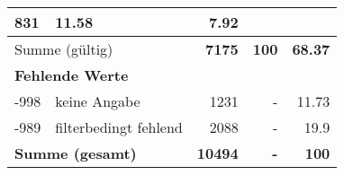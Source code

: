 \begin{longtable}{lXrrr}
       \num{831} &
       \num[round-mode=places,round-precision=2]{11.58} &
         \num[round-mode=places,round-precision=2]{7.92} \\
     \midrule
     \multicolumn{2}{l}{Summe (gültig)} &
       \textbf{\num{7175}} &
     \textbf{\num{100}} &
       \textbf{\num[round-mode=places,round-precision=2]{68.37}} \\
     \multicolumn{5}{l}{\textbf{Fehlende Werte}}\\
       -998 &
       keine Angabe &
         \num{1231} &
        - &
         \num[round-mode=places,round-precision=2]{11.73} \\
       -989 &
       filterbedingt fehlend &
         \num{2088} &
        - &
         \num[round-mode=places,round-precision=2]{19.9} \\
     \midrule
     \multicolumn{2}{l}{\textbf{Summe (gesamt)}} &
          \textbf{\num{10494}} &
        \textbf{-} &
        \textbf{\num{100}} \\
     \bottomrule
     \end{longtable}
     
